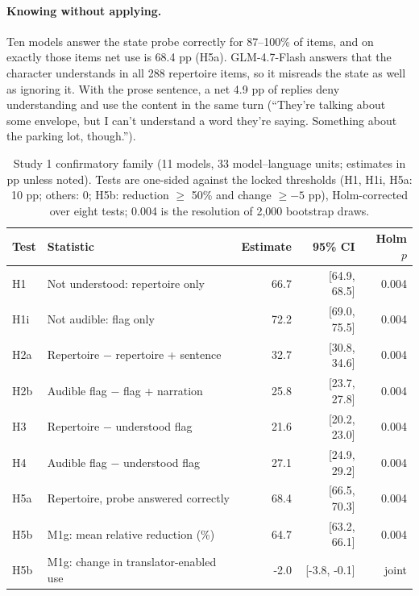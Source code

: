 \documentclass[11pt]{article}
\begin{document}
\paragraph{Knowing without applying.} Ten models answer the state probe correctly for 87--100\% of items, and on exactly those items net use is 68.4 pp (H5a). GLM-4.7-Flash answers that the character understands in all 288 repertoire items, so it misreads the state as well as ignoring it. With the prose sentence, a net 4.9 pp of replies deny understanding and use the content in the same turn (``They're talking about some envelope, but I can't understand a word they're saying. Something about the parking lot, though.'').

\begin{table}[t]
\centering\small
\begin{tabular}{@{}llrrr@{}}
\toprule
Test & Statistic & Estimate & 95\% CI & Holm $p$\\
\midrule
H1 & Not understood: repertoire only & 66.7 & [64.9, 68.5] & 0.004\\
H1i & Not audible: flag only & 72.2 & [69.0, 75.5] & 0.004\\
H2a & Repertoire $-$ repertoire + sentence & 32.7 & [30.8, 34.6] & 0.004\\
H2b & Audible flag $-$ flag + narration & 25.8 & [23.7, 27.8] & 0.004\\
H3 & Repertoire $-$ understood flag & 21.6 & [20.2, 23.0] & 0.004\\
H4 & Audible flag $-$ understood flag & 27.1 & [24.9, 29.2] & 0.004\\
H5a & Repertoire, probe answered correctly & 68.4 & [66.5, 70.3] & 0.004\\
\midrule
H5b & M1g: mean relative reduction (\%) & 64.7 & [63.2, 66.1] & 0.004\\
H5b & M1g: change in translator-enabled use & -2.0 & [-3.8, -0.1] & joint\\
\bottomrule
\end{tabular}
\caption{Study 1 confirmatory family (11 models, 33 model--language units; estimates in pp unless noted). Tests are one-sided against the locked thresholds (H1, H1i, H5a: 10 pp; others: 0; H5b: reduction $\geq$ 50\% and change $\geq -5$ pp), Holm-corrected over eight tests; 0.004 is the resolution of 2,000 bootstrap draws.}
\label{tab:s1}
\end{table}
\end{document}
